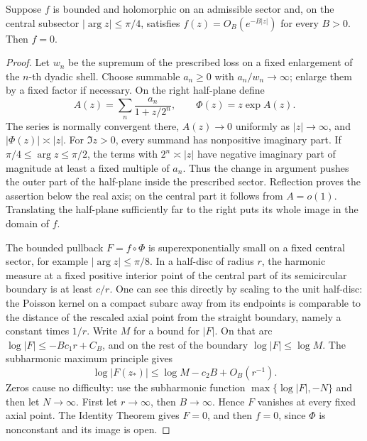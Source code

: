 \begin{lemma}\label{path:sector-uniqueness}
Suppose \(f\) is bounded and holomorphic on an admissible sector and, on
the central subsector \(|\arg z|\le\pi/4\), satisfies
\(f(z)=O_B(e^{-B|z|})\) for every \(B>0\).  Then \(f=0\).
\end{lemma}
\begin{proof}
Let \(w_n\) be the supremum of the prescribed loss on a fixed enlargement
of the \(n\)-th dyadic shell.  Choose summable \(a_n\ge0\) with
\(a_n/w_n\to\infty\); enlarge them by a fixed factor if necessary.
On the right half-plane define
\[
 A(z)=\sum_n\frac{a_n}{1+z/2^n},\qquad \Phi(z)=z\exp A(z).
\]
The series is normally convergent there, \(A(z)\to0\) uniformly as
\(|z|\to\infty\), and \(|\Phi(z)|\asymp|z|\).  For \(\Im z>0\),
every summand has nonpositive imaginary part.  If
\(\pi/4\le\arg z\le\pi/2\), the terms with \(2^n\asymp|z|\)
have negative imaginary part of magnitude at least a fixed multiple of
\(a_n\).  Thus the change in argument pushes the outer part of the
half-plane inside the prescribed sector.  Reflection proves the assertion
below the real axis; on the central part it follows from \(A=o(1)\).
Translating the half-plane sufficiently far to the right puts its whole
image in the domain of \(f\).

The bounded pullback \(F=f\circ\Phi\) is superexponentially small on a
fixed central sector, for example \(|\arg z|\le\pi/8\).  In a
half-disc of radius \(r\), the harmonic measure at a fixed positive
interior point of the central part of its semicircular boundary is at
least \(c/r\).  One can see this directly by scaling to the unit
half-disc: the Poisson kernel on a compact subarc away from its endpoints
is comparable to the distance of the rescaled axial point from the
straight boundary, namely a constant times \(1/r\).  Write
\(M\) for a bound for \(|F|\).  On that arc
\(\log|F|\le-Bc_1r+C_B\), and on the rest of the boundary
\(\log|F|\le\log M\).  The subharmonic maximum principle gives
\[
 \log|F(z_*)|\le\log M-c_2B+O_B(r^{-1}).
\]
Zeros cause no difficulty: use the subharmonic function
\(\max\{\log|F|,-N\}\) and then let \(N\to\infty\).
First let \(r\to\infty\), then \(B\to\infty\).  Hence \(F\) vanishes
at every fixed axial point.  The Identity Theorem gives \(F=0\), and
then \(f=0\), since \(\Phi\) is nonconstant and its image is open.
\end{proof}

